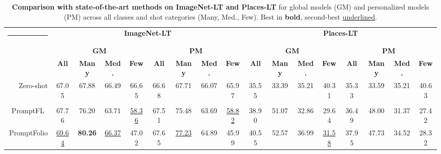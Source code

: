 \documentclass[10pt,twocolumn,letterpaper]{article}
\makeatletter
\newcommand{\thickhline}{%
  \noalign{\ifnum0=`}\fi\hrule height 1pt\relax
  \futurelet\reserved@a\@xhline
}
\makeatother
\begin{document}





\begin{table}[t]
\centering
\caption{\textbf{Comparison with state-of-the-art methods on ImageNet-LT and Places-LT} for global models (GM) and personalized models (PM) across all classes and shot categories (Many, Med., Few). Best in \textbf{bold}, second-best \underline{underlined}.}
\footnotesize
\setlength\tabcolsep{2pt}
\renewcommand\arraystretch{1.1}
\begin{tabular}{r||cccc|cccc|cccc|cccc}
\hline\thickhline
\rowcolor{gray!20}
\multirow{3}{*}{\textbf{Method}} & \multicolumn{8}{c|}{\textbf{ImageNet-LT}} & \multicolumn{8}{c}{\textbf{Places-LT}} \\
\cline{2-17}
\rowcolor{gray!20}
 & \multicolumn{4}{c}{\textbf{GM}} & \multicolumn{4}{c|}{\textbf{PM}} & \multicolumn{4}{c}{\textbf{GM}} & \multicolumn{4}{c}{\textbf{PM}} \\
\cline{2-17}
\rowcolor{gray!20}
\multirow{-3}{*}{\textbf{Method}} & \textbf{All} & \textbf{Many} & \textbf{Med.} & \textbf{Few} & \textbf{All} & \textbf{Many} & \textbf{Med.} & \textbf{Few} & \textbf{All} & \textbf{Many} & \textbf{Med.} & \textbf{Few} & \textbf{All} & \textbf{Many} & \textbf{Med.} & \textbf{Few} \\
\hline\hline
Zero-shot &  67.05 & 67.88 & 66.49 & 66.65 & 66.68 & 67.71 & 66.07 & 65.97 & 35.55 & 33.39 & 35.21 & 40.31 & 35.33 & 33.59 & 35.21 & 40.63 \\
\hdashline

\multicolumn{17}{l}{\textcolor{gray!60}{\textit{Prompt-based}}} \\
\cellcolor{gray!10}PromptFL~\cite{guo2023promptfl}
 & \cellcolor{gray!10}67.76 & \cellcolor{gray!10}76.20 & \cellcolor{gray!10}63.71 & \cellcolor{gray!10}\underline{58.36}
 & \cellcolor{gray!10}67.51 & \cellcolor{gray!10}75.48 & \cellcolor{gray!10}63.69 & \cellcolor{gray!10}\underline{58.82}
 & \cellcolor{gray!10}38.90 & \cellcolor{gray!10}51.07 & \cellcolor{gray!10}32.86 & \cellcolor{gray!10}29.64
 & \cellcolor{gray!10}36.49 & \cellcolor{gray!10}48.00 & \cellcolor{gray!10}31.37 & \cellcolor{gray!10}27.42 \\

 
PromptFolio~\cite{pan2024promptfolio}
 & \underline{69.64} & \textbf{80.26} & \underline{66.37} & 47.02
 & 67.65 & \underline{77.23} & 64.89 & 45.99
 & 40.55 & 52.57 & 36.99 & \underline{31.58}
 & 37.95 & 47.73 & 34.52 & 28.32 \\



\end{tabular}
\end{table}
\end{document}
